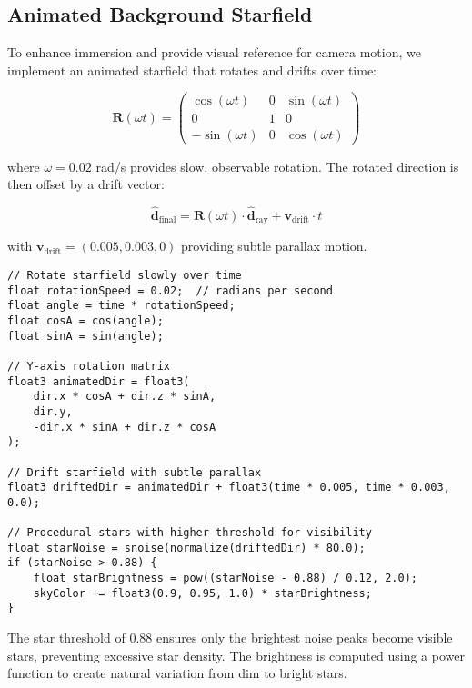 \documentclass[12pt,a4paper]{article}
\theoremstyle{definition}
\theoremstyle{remark}
\begin{document}
\subsection{Animated Background Starfield}

To enhance immersion and provide visual reference for camera motion, we implement an animated starfield that rotates and drifts over time:

\begin{equation}
    \mathbf{R}(\omega t) = \begin{pmatrix}
        \cos(\omega t) & 0 & \sin(\omega t) \\
        0 & 1 & 0 \\
        -\sin(\omega t) & 0 & \cos(\omega t)
    \end{pmatrix}
\end{equation}

where $\omega = 0.02$ rad/s provides slow, observable rotation. The rotated direction is then offset by a drift vector:

\begin{equation}
    \hat{\mathbf{d}}_{\text{final}} = \mathbf{R}(\omega t) \cdot \hat{\mathbf{d}}_{\text{ray}} + \mathbf{v}_{\text{drift}} \cdot t
\end{equation}

with $\mathbf{v}_{\text{drift}} = (0.005, 0.003, 0)$ providing subtle parallax motion.

\begin{lstlisting}[style=metalstyle, caption=Animated starfield implementation]
// Rotate starfield slowly over time
float rotationSpeed = 0.02;  // radians per second
float angle = time * rotationSpeed;
float cosA = cos(angle);
float sinA = sin(angle);

// Y-axis rotation matrix
float3 animatedDir = float3(
    dir.x * cosA + dir.z * sinA,
    dir.y,
    -dir.x * sinA + dir.z * cosA
);

// Drift starfield with subtle parallax
float3 driftedDir = animatedDir + float3(time * 0.005, time * 0.003, 0.0);

// Procedural stars with higher threshold for visibility
float starNoise = snoise(normalize(driftedDir) * 80.0);
if (starNoise > 0.88) {
    float starBrightness = pow((starNoise - 0.88) / 0.12, 2.0);
    skyColor += float3(0.9, 0.95, 1.0) * starBrightness;
}
\end{lstlisting}

The star threshold of 0.88 ensures only the brightest noise peaks become visible stars, preventing excessive star density. The brightness is computed using a power function to create natural variation from dim to bright stars.
\end{document}
